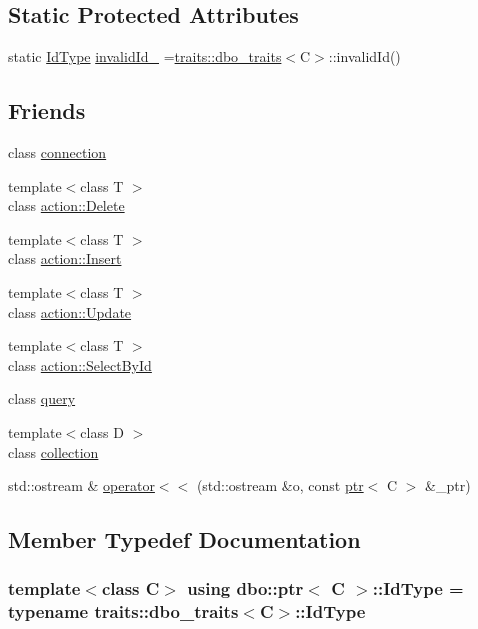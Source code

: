 \subsection*{Static Protected Attributes}
\begin{DoxyCompactItemize}
\item 
static \hyperlink{classdbo_1_1ptr_a01fdb2e2c0743eb8bd1b822ccc8d4cd4}{Id\+Type} \hyperlink{classdbo_1_1ptr_a26f06bd10de2444190c904a1814999fa}{invalid\+Id\+\_\+} =\hyperlink{structdbo_1_1traits_1_1dbo__traits}{traits\+::dbo\+\_\+traits}$<$C$>$\+::invalid\+Id()
\end{DoxyCompactItemize}
\subsection*{Friends}
\begin{DoxyCompactItemize}
\item 
class \hyperlink{classdbo_1_1ptr_adb115488bb4890f7fc705ee527ad71e0}{connection}
\item 
{\footnotesize template$<$class T $>$ }\\class \hyperlink{classdbo_1_1ptr_ae779179e16547c9a93329dd197385493}{action\+::\+Delete}
\item 
{\footnotesize template$<$class T $>$ }\\class \hyperlink{classdbo_1_1ptr_a88a9b73e2cb3304941371508b660e53e}{action\+::\+Insert}
\item 
{\footnotesize template$<$class T $>$ }\\class \hyperlink{classdbo_1_1ptr_a90af99826aea472a0aa22e59376fed0f}{action\+::\+Update}
\item 
{\footnotesize template$<$class T $>$ }\\class \hyperlink{classdbo_1_1ptr_a8b98481706995f8b3e2665f74b2b3039}{action\+::\+Select\+By\+Id}
\item 
class \hyperlink{classdbo_1_1ptr_a7fddf73eaed86e45a2aacbd26b5af751}{query}
\item 
{\footnotesize template$<$class D $>$ }\\class \hyperlink{classdbo_1_1ptr_a916ea84dc420573cfdb360b67445d5d0}{collection}
\item 
std\+::ostream \& \hyperlink{classdbo_1_1ptr_a70a1cd538b5f03fbc42965ac8f918f23}{operator$<$$<$} (std\+::ostream \&o, const \hyperlink{classdbo_1_1ptr}{ptr}$<$ C $>$ \&\+\_\+ptr)
\end{DoxyCompactItemize}


\subsection{Member Typedef Documentation}
\hypertarget{classdbo_1_1ptr_a01fdb2e2c0743eb8bd1b822ccc8d4cd4}{
\subsubsection[{Id\+Type}]{\setlength{\rightskip}{0pt plus 5cm}template$<$class C$>$ using {\bf dbo\+::ptr}$<$ C $>$\+::{\bf Id\+Type} =  typename {\bf traits\+::dbo\+\_\+traits}$<$C$>$\+::{\bf Id\+Type}}}\label{classdbo_1_1ptr_a01fdb2e2c0743eb8bd1b822ccc8d4cd4}


